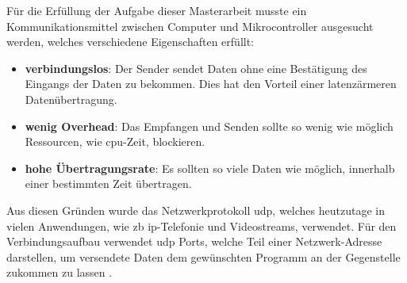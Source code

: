 \documentclass[../EDF Master Thesis.tex]{subfiles}
\begin{document}
    Für die Erfüllung der Aufgabe dieser Masterarbeit musste ein Kommunikationsmittel zwischen Computer und Mikrocontroller ausgesucht werden, welches verschiedene Eigenschaften erfüllt:
    \begin{itemize}
        \item \textbf{verbindungslos}: Der Sender sendet Daten ohne eine Bestätigung des Eingangs der Daten zu bekommen.
                                       Dies hat den Vorteil einer latenzärmeren Datenübertragung.
        \item \textbf{wenig Overhead}: Das Empfangen und Senden sollte so wenig wie möglich Ressourcen, wie \ac{cpu}-Zeit, blockieren.
        \item \textbf{hohe Übertragungsrate}: Es sollten so viele Daten wie möglich, innerhalb einer bestimmten Zeit übertragen.
    \end{itemize}

    Aus diesen Gründen wurde das Netzwerkprotokoll \ac{udp}, welches heutzutage in vielen Anwendungen, wie \ac{zb} \ac{ip}-Telefonie und Videostreams, verwendet.
    Für den Verbindungsaufbau verwendet \ac{udp} Ports, welche Teil einer Netzwerk-Adresse darstellen, um versendete Daten dem gewünschten Programm an der Gegenstelle zukommen zu lassen \parencite{wiki:009}.
\end{document}
